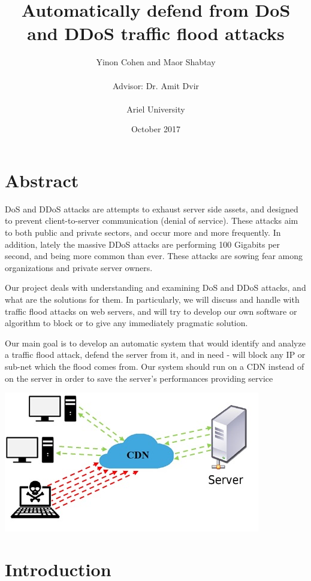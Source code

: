 \documentclass{report}
\title{Automatically defend from DoS and DDoS traffic flood attacks}
\author{Yinon Cohen and Maor Shabtay\\\\{ Advisor: Dr. Amit Dvir}\\\\{Ariel University}}
\date{October 2017}
\begin{document}
\maketitle

\tableofcontents
{}


\newpage

\chapter {Abstract}
\hfill \break DoS and DDoS attacks are attempts to exhaust server side assets, and designed to prevent client-to-server communication (denial of service). These attacks aim to both public and private sectors, and occur more and more frequently. In addition, lately the massive DDoS attacks are performing 100 Gigabits per second, and being more common than ever. These attacks are sowing fear among organizations and private server owners.

\hfill \break Our project deals with understanding and examining DoS and DDoS attacks, and what are the solutions for them. In particularly, we will discuss and handle with traffic flood attacks on web servers, and will try to develop our own software or algorithm to block or to give any immediately pragmatic solution.

\hfill \break Our main goal is to develop an automatic system that would identify and analyze a traffic flood attack, defend the server from it, and in need - will block any IP or sub-net which the flood comes from. Our system should run on a CDN instead of on the server in order to save the server’s performances providing service
\hfill \break \hfill \break
    \begin{center}
        \includegraphics{pi}
    \end{center}
\newpage
\chapter {Introduction}
\end{document}
